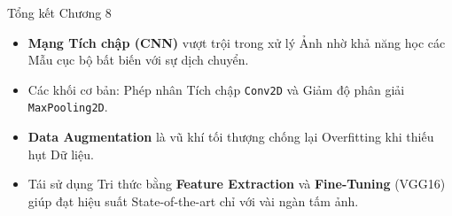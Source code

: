 \documentclass[aspectratio=169]{beamer}
\begin{document}
\begin{frame}{Tổng kết Chương 8}
    \begin{itemize}
        \item \textbf{Mạng Tích chập (CNN)} vượt trội trong xử lý Ảnh nhờ khả năng học các Mẫu cục bộ bất biến với sự dịch chuyển.
        \item Các khối cơ bản: Phép nhân Tích chập \texttt{Conv2D} và Giảm độ phân giải \texttt{MaxPooling2D}.
        \item \textbf{Data Augmentation} là vũ khí tối thượng chống lại Overfitting khi thiếu hụt Dữ liệu.
        \item Tái sử dụng Tri thức bằng \textbf{Feature Extraction} và \textbf{Fine-Tuning} (VGG16) giúp đạt hiệu suất State-of-the-art chỉ với vài ngàn tấm ảnh.
    \end{itemize}
\end{frame}
\end{document}
